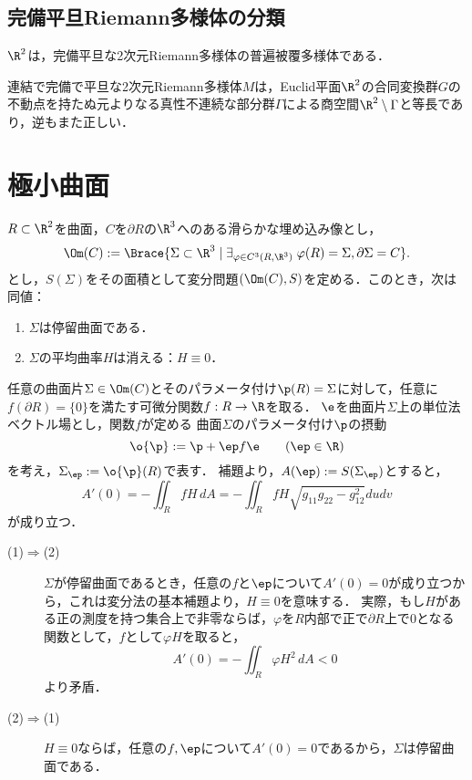 \documentclass[uplatex,dvipdfmx]{jsreport}
\begin{document}
\subsection{完備平旦Riemann多様体の分類}

\begin{theorem}
    $\R^2$は，完備平旦な2次元Riemann多様体の普遍被覆多様体である．
\end{theorem}

\begin{theorem}
    連結で完備で平旦な2次元Riemann多様体$M$は，Euclid平面$\R^2$の合同変換群$G$の不動点を持たぬ元よりなる真性不連続な部分群$\Gamma$による商空間$\R^2\setminus\Gamma$と等長であり，逆もまた正しい．
\end{theorem}

\section{極小曲面}

\begin{problem}[停留曲面は極小曲面に同値]
    $R\subset\R^2$を曲面，$C$を$\partial R$の$\R^3$へのある滑らかな埋め込み像とし，
    \[\Om(C):=\Brace{\Sigma\subset\R^3\mid\exists_{\varphi\in C^3(R,\R^3)}\;\varphi(R)=\Sigma,\partial\Sigma=C}.\]
    とし，$S(\Sigma)$をその面積として変分問題$(\Om(C),S)$を定める．このとき，次は同値：
    \begin{enumerate}
        \item $\Sigma$は停留曲面である．
        \item $\Sigma$の平均曲率$H$は消える：$H\equiv0$．
    \end{enumerate}
\end{problem}
\begin{Proof}
    任意の曲面片$\Sigma\in\Om(C)$とそのパラメータ付け$\p(R)=\Sigma$に対して，任意に$f(\partial R)=\{0\}$を満たす可微分関数$f:R\to\R$を取る．
    $\e$を曲面片$\Sigma$上の単位法ベクトル場とし，関数$f$が定める
    曲面$\Sigma$のパラメータ付け$\p$の摂動
    \[\o{\p}:=\p+\ep f\e\qquad(\ep\in\R)\]
    を考え，$\Sigma_\ep:=\o{\p}(R)$で表す．
    補題より，$A(\ep):=S(\Sigma_\ep)$とすると，
    \[A'(0)=-\iint_RfH\,dA=-\iint_RfH\sqrt{g_{11}g_{22}-g_{12}^2}dudv\]
    が成り立つ．
    \begin{description}
        \item[(1)$\Rightarrow$(2)] $\Sigma$が停留曲面であるとき，任意の$f$と$\ep$について$A'(0)=0$が成り立つから，これは変分法の基本補題より，$H\equiv0$を意味する．
        実際，もし$H$がある正の測度を持つ集合上で非零ならば，$\varphi$を$R$内部で正で$\partial R$上で$0$となる関数として，$f$として$\varphi H$を取ると，
        \[A'(0)=-\iint_R\varphi H^2\,dA<0\]
        より矛盾．
        \item[(2)$\Rightarrow$(1)] $H\equiv0$ならば，任意の$f,\ep$について$A'(0)=0$であるから，$\Sigma$は停留曲面である．
    \end{description}
\end{Proof}
\end{document}
